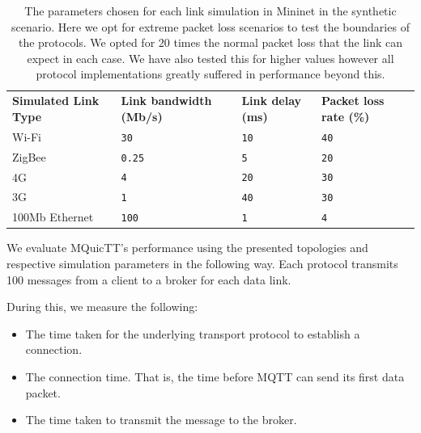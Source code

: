 \begin{table}[ht]
    \caption{The parameters chosen for each link simulation in Mininet in the synthetic scenario. Here we opt for extreme packet loss scenarios to test the boundaries of the protocols. We opted for 20 times the normal packet loss that the link can expect in each case. We have also tested this for higher values however all protocol implementations greatly suffered in performance beyond this.}\label{tab:links:synth}
    \begin{tabular}{@{}llll@{}}
        \toprule
        \textbf{Simulated Link Type} & \textbf{Link bandwidth (Mb/s)} & \textbf{Link delay (ms)} & \textbf{Packet loss rate (\%)} \\
        Wi-Fi                        & \texttt{30}                    & \texttt{10}              & \texttt{40}                     \\
        ZigBee                       & \texttt{0.25}                  & \texttt{5}               & \texttt{20}                     \\
        4G                           & \texttt{4}                     & \texttt{20}              & \texttt{30}                   \\
        3G                           & \texttt{1}                     & \texttt{40}              & \texttt{30}                   \\
        100Mb Ethernet               & \texttt{100}                   & \texttt{1}               & \texttt{4}                   \\
        \bottomrule
    \end{tabular}
\end{table}

We evaluate MQuicTT's performance using the presented topologies and respective simulation parameters in the following way.
Each protocol transmits 100 messages from a client to a broker for each data link.

During this, we measure the following:

\begin{itemize}
    \item The time taken for the underlying transport protocol to establish a connection.
    \item The connection time. That is, the time before MQTT can send its first data packet.
    \item The time taken to transmit the message to the broker.
\end{itemize}

